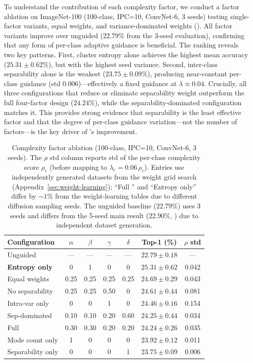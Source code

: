 To understand the contribution of each complexity factor, we conduct a factor ablation on ImageNet-100 (100-class, IPC=10, ConvNet-6, 3 seeds) testing single-factor variants, equal weights, and variance-dominated weights (). All factor variants improve over unguided ($22.79\%$ from the 3-seed evaluation), confirming that any form of per-class adaptive guidance is beneficial. The ranking reveals two key patterns. First, cluster entropy alone achieves the highest mean accuracy ($25.31 \pm 0.62\%$), but with the highest seed variance. Second, inter-class separability alone is the weakest ($23.75 \pm 0.09\%$), producing near-constant per-class guidance (std $0.006$)---effectively a fixed guidance at $\lambda \approx 0.04$. Crucially, all three configurations that reduce or eliminate separability weight outperform the full four-factor design ($24.24\%$), while the separability-dominated configuration matches it. This provides strong evidence that separability is the least effective factor and that the degree of per-class guidance variation---not the number of factors---is the key driver of \cags{}'s improvement.

\begin{table}[t]
\centering
\footnotesize
\caption{Complexity factor ablation (100-class, IPC=10, ConvNet-6, 3 seeds). The $\rho$ std column reports std of the per-class complexity score $\rho_c$ (before mapping to $\lambda_c = 0.06\,\rho_c$). Entries use independently generated datasets from the weight grid search (Appendix~\ref{sec:weight-learning}); ``Full \cags{}'' and ``Entropy only'' differ by ${\sim}1\%$ from the weight-learning tables due to different diffusion sampling seeds. The unguided baseline ($22.79\%$) uses 3 seeds and differs from the 5-seed main result ($22.90\%$, ) due to independent dataset generation.}
\label{tab:factor-ablation}
\begin{tabular}{lcccccc}
\toprule
\textbf{Configuration} & $\alpha$ & $\beta$ & $\gamma$ & $\delta$ & \textbf{Top-1 (\%)} & \textbf{$\rho$ std} \\
\midrule
Unguided & --- & --- & --- & --- & $22.79 \pm 0.18$ & --- \\
\midrule
\textbf{Entropy only} & 0 & 1 & 0 & 0 & $\mathbf{25.31 \pm 0.62}$ & 0.042 \\
Equal weights & 0.25 & 0.25 & 0.25 & 0.25 & $24.69 \pm 0.29$ & 0.043 \\
No separability & 0.25 & 0.25 & 0.50 & 0 & $24.61 \pm 0.44$ & 0.081 \\
Intra-var only & 0 & 0 & 1 & 0 & $24.46 \pm 0.16$ & 0.154 \\
Sep-dominated & 0.10 & 0.10 & 0.20 & 0.60 & $24.25 \pm 0.44$ & 0.034 \\
Full \cags{} & 0.30 & 0.30 & 0.20 & 0.20 & $24.24 \pm 0.26$ & 0.035 \\
Mode count only & 1 & 0 & 0 & 0 & $23.92 \pm 0.12$ & 0.011 \\
Separability only & 0 & 0 & 0 & 1 & $23.75 \pm 0.09$ & 0.006 \\
\bottomrule
\end{tabular}
\end{table}

